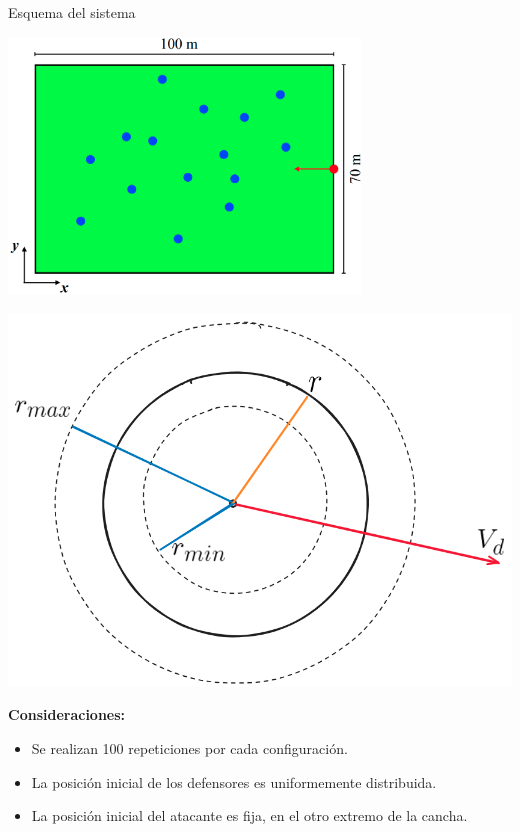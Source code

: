 \begin{frame}{Esquema del sistema}
    \begin{center}
        \begin{minipage}{0.55\textwidth}
            \includegraphics[width=0.7\textwidth]{pic/04-simulaciones/esquema-field}
        \end{minipage}
        \hfill
        \begin{minipage}{0.4\textwidth}
            \includegraphics[width=\textwidth]{pic/04-simulaciones/esquema-particula}
        \end{minipage}
    \end{center}

    \footnotesize{
        \textbf{Consideraciones:}
        \begin{itemize}
            \item Se realizan 100 repeticiones por cada configuración.
            \item La posición inicial de los defensores es uniformemente distribuida.
            \item La posición inicial del atacante es fija, en el otro extremo de la cancha.
        \end{itemize}
    }

\end{frame}


